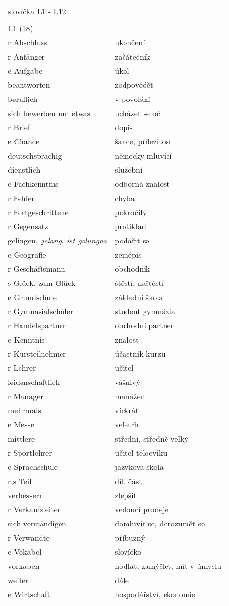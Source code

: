 \documentclass{article}
\begin{document}
 \begin{tabular}{ p{5cm}|p{5cm}  }
    slovíčka L1 - L12 \\
    \\
    L1 (18) \\
    r Abschluss & ukončení\\
    r Anfänger & začátečník\\
    e Aufgabe & úkol\\
    beantworten & zodpovědět\\
    beruflich & v povolání\\
    sich bewerben um etwas & ucházet se oč\\
    r Brief & dopis\\
    e Chance & šance, příležitost\\
    deutschsprachig & německy mluvící\\
    dienstlich & služební\\
    e Fachkenntnis & odborná znalost\\
    r Fehler & chyba\\
    r Fortgeschrittene & pokročilý\\
    r Gegensatz & protiklad\\
    gelingen, \it{gelang, ist gelungen} & podařit se\\
    e Geografie & zeměpis\\
    r Geschäftsmann & obchodník\\
    s Glück, zum Glück & štěstí, naštěstí\\
    e Grundschule & základní škola\\
    r Gymnasialschüler & student gymnázia\\
    r Handelspartner & obchodní partner\\
    e Kenntnis & znalost\\
    r Kursteilnehmer & účastník kurzu\\
    r Lehrer & učitel\\
    leidenschaftlich & vášnivý\\
    r Manager & manažer\\
    mehrmals & víckrát\\
    e Messe & veletrh\\
    mittlere & střední, středně velký\\
    r Sportlehrer & učitel tělocviku\\
    e Sprachschule & jazyková škola\\
    r,s Teil & díl, část \\
    verbessern & zlepšit\\
    r Verkaufsleiter & vedoucí prodeje\\
    sich verständigen & domluvit se, dorozumět se\\
    r Verwandte & příbuzný\\
    e Vokabel & slovíčko\\
    vorhaben & hodlat, zamýšlet, mít v úmyslu\\
    weiter & dále\\
    e Wirtschaft & hospodářství, ekonomie\\
\end{tabular}
\end{document}
